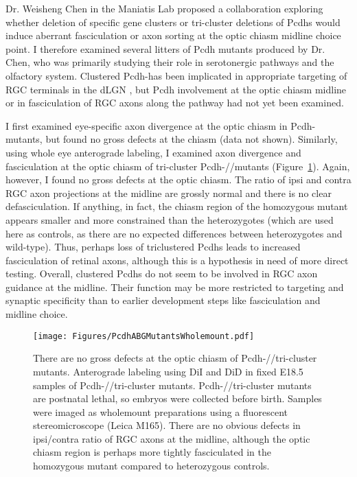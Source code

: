 Dr. Weisheng Chen in the Maniatis Lab proposed a collaboration exploring whether deletion of specific gene clusters or tri-cluster deletions of Pcdhs would induce aberrant fasciculation or axon sorting at the optic chiasm midline choice point.
I therefore examined several litters of Pcdh mutants produced by Dr. Chen, who was primarily studying their role in serotonergic pathways and the olfactory system. 
Clustered Pcdh-\alpha has been implicated in appropriate targeting of RGC terminals in the dLGN \cite{meguro2015impaired}, but Pcdh involvement at the optic chiasm midline or in fasciculation of RGC axons along the pathway had not yet been examined.

I first examined eye-specific axon divergence at the optic chiasm in Pcdh-\alpha mutants, but found no gross defects at the chiasm (data not shown).
Similarly, using whole eye anterograde labeling, I examined axon divergence and fasciculation at the optic chiasm of tri-cluster Pcdh-\alpha/\beta/\gamma mutants (Figure~\ref{PcdhABGMutantsWholemount}). 
Again, however, I found no gross defects at the optic chiasm.
The ratio of ipsi and contra RGC axon projections at the midline are grossly normal and there is no clear defasciculation.
If anything, in fact, the chiasm region of the homozygous mutant appears smaller and more constrained than the heterozygotes (which are used here as controls, as there are no expected differences between heterozygotes and wild-type).
Thus, perhaps loss of triclustered Pcdhs leads to increased fasciculation of retinal axons, although this is a hypothesis in need of more direct testing.
Overall, clustered Pcdhs do not seem to be involved in RGC axon guidance at the midline.
Their function may be more restricted to targeting and synaptic specificity than to earlier development steps like fasciculation and midline choice.
\begin{figure}[hbtp]
    \begin{center}
        \texttt{[image: Figures/PcdhABGMutantsWholemount.pdf]}
        \caption[There are no gross defects at the optic chiasm of Pcdh-\alpha/\beta/\gamma tri-cluster mutants.]
        {There are no gross defects at the optic chiasm of Pcdh-\alpha/\beta/\gamma tri-cluster mutants.
		Anterograde labeling using DiI and DiD in fixed E18.5 samples of Pcdh-\alpha/\beta/\gamma tri-cluster mutants.
		Pcdh-\alpha/\beta/\gamma tri-cluster mutants are postnatal lethal, so embryos were collected before birth.
		Samples were imaged as wholemount preparations using a fluorescent stereomicroscope (Leica M165).
		There are no obvious defects in ipsi/contra ratio of RGC axons at the midline, although the optic chiasm region is perhaps more tightly fasciculated in the homozygous mutant compared to heterozygous controls.
		}
        \label{PcdhABGMutantsWholemount}
    \end{center}
\end{figure}